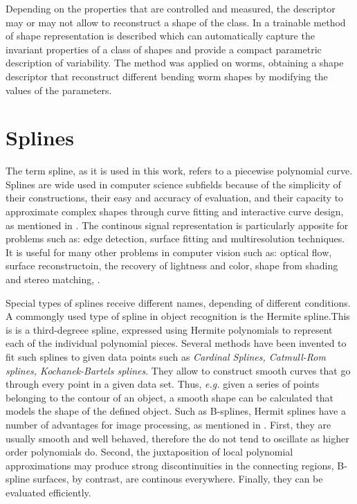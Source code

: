 Depending on the properties that are controlled and measured, the descriptor
may or may not allow to reconstruct a shape of the class. In \cite{wormparam} 
a trainable method of shape representation is described which can
automatically capture the invariant properties of a class of shapes and 
provide a compact parametric description of variability. The method was
applied on worms, obtaining a shape descriptor that reconstruct different
bending worm shapes by modifying the values of the parameters.\\

\section{Splines}
\label{sec:splines}

The term spline, as it is used in this work, refers to a piecewise polynomial curve. Splines
are wide used in computer science subfields because of the simplicity of their constructions,
their easy and accuracy of evaluation, and their capacity to approximate complex shapes
through curve fitting and interactive curve design, as mentioned in \cite{web:splines}.
The continous signal representation is particularly apposite for 
problems such as: edge detection, surface fitting and multiresolution
techniques. It is useful for many other problems in computer
vision such as: optical flow, surface reconstructoin, the recovery
of lightness and color, shape from shading and stereo matching,
\cite[821]{splinespap}.

Special types of splines receive different names, depending of different conditions.\\
A commongly used type of spline in object recognition is the Hermite spline.This is
is a third-degreee spline, expressed using Hermite polynomials to represent each of the 
individual polynomial pieces. 
Several methods have been invented to fit such splines to given data points such
as \emph{Cardinal Splines, Catmull-Rom splines, Kochanek-Bartels splines}. They allow to
construct smooth curves that go through every point in a given data set. Thus, \emph{e.g.} 
given a series of points belonging to the contour of an object, a smooth shape can be 
calculated that models the shape of the defined object.  
Such as B-splines, Hermit splines have a number of advantages for image processing, as
mentioned in \cite{splinespap}.
First, they are usually smooth and well behaved, therefore the do not tend to oscillate
as higher order polynomials do. Second, the juxtaposition of local polynomial approximations
may produce strong discontinuities in the connecting regions, B-spline
surfaces, by contrast, are continous everywhere. 
Finally, they can be evaluated efficiently.